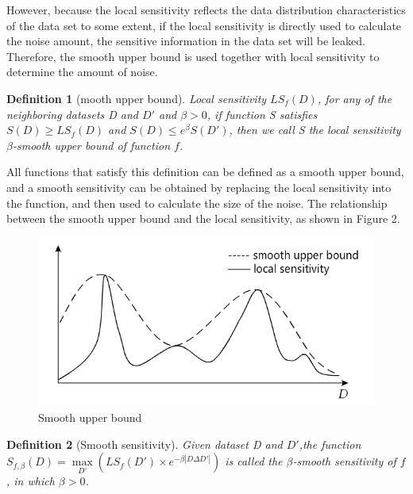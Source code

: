 \documentclass[10pt,conference]{IEEEtran}
\newtheorem{definition}{Definition}
\begin{document}
However, because the local sensitivity reflects the data distribution characteristics of the data set to some extent, if the local sensitivity is directly used to calculate the noise amount, the sensitive information in the data set will be leaked. Therefore, the smooth upper bound is used together with local sensitivity to determine the amount of noise.

\begin{definition}
[mooth upper bound\cite{Dwork2011A}]Local sensitivity $L{S_f}(D)$, for any of the neighboring datasets D and $D′$ and $\beta > 0$, if function S satisfies $S(D) \ge L{S_f}(D)$ and $S(D) \le {e^\beta }S(D')$, then we call S the local sensitivity $β$-smooth upper bound of function $f$.
\end{definition}

All functions that satisfy this definition can be defined as a smooth upper bound, and a smooth sensitivity can be obtained by replacing the local sensitivity into the function, and then used to calculate the size of the noise. The relationship between the smooth upper bound and the local sensitivity, as shown in Figure 2.

\begin{figure}[h]
    \centering
    \includegraphics[scale=0.4]{smoothUpperBound.png}
    \caption{Smooth upper bound}
    \label{fig:figere}
\end{figure}


\begin{definition}
[Smooth sensitivity\cite{Nissim2007Smooth}] Given dataset D and $D'$,the function $S_{f,\beta }(D)=\mathop {\max }\limits_{D'}(LS_{f}(D')×e^{-\beta |D\Delta D'|})$ is called the $\beta$-smooth sensitivity of $f$, in which $\beta>0$.
\end{definition}
\end{document}
